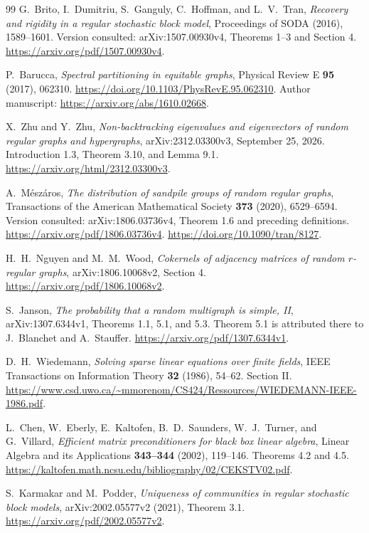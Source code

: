\begin{thebibliography}{99}
G.~Brito, I.~Dumitriu, S.~Ganguly, C.~Hoffman, and L.~V.~Tran,
\emph{Recovery and rigidity in a regular stochastic block model},
Proceedings of SODA (2016), 1589--1601.
Version consulted: arXiv:1507.00930v4, Theorems 1--3 and Section 4.
\url{https://arxiv.org/pdf/1507.00930v4}.

P.~Barucca, \emph{Spectral partitioning in equitable graphs},
Physical Review E \textbf{95} (2017), 062310.
\url{https://doi.org/10.1103/PhysRevE.95.062310}.
Author manuscript: \url{https://arxiv.org/abs/1610.02668}.

X.~Zhu and Y.~Zhu, \emph{Non-backtracking eigenvalues and eigenvectors
of random regular graphs and hypergraphs}, arXiv:2312.03300v3,
September 25, 2026. Introduction 1.3, Theorem 3.10, and Lemma 9.1.
\url{https://arxiv.org/html/2312.03300v3}.

A.~M\'esz\'aros, \emph{The distribution of sandpile groups of random
regular graphs}, Transactions of the American Mathematical Society
\textbf{373} (2020), 6529--6594.
Version consulted: arXiv:1806.03736v4, Theorem 1.6 and preceding definitions.
\url{https://arxiv.org/pdf/1806.03736v4}.
\url{https://doi.org/10.1090/tran/8127}.

H.~H.~Nguyen and M.~M.~Wood,
\emph{Cokernels of adjacency matrices of random $r$-regular graphs},
arXiv:1806.10068v2, Section 4.
\url{https://arxiv.org/pdf/1806.10068v2}.

S.~Janson, \emph{The probability that a random multigraph is simple, II},
arXiv:1307.6344v1, Theorems 1.1, 5.1, and 5.3.
Theorem 5.1 is attributed there to J.~Blanchet and A.~Stauffer.
\url{https://arxiv.org/pdf/1307.6344v1}.

D.~H.~Wiedemann, \emph{Solving sparse linear equations over finite fields},
IEEE Transactions on Information Theory \textbf{32} (1986), 54--62.
Section II.
\url{https://www.csd.uwo.ca/~mmorenom/CS424/Ressources/WIEDEMANN-IEEE-1986.pdf}.

L.~Chen, W.~Eberly, E.~Kaltofen, B.~D.~Saunders, W.~J.~Turner,
and G.~Villard, \emph{Efficient matrix preconditioners for black box
linear algebra}, Linear Algebra and its Applications \textbf{343--344}
(2002), 119--146. Theorems 4.2 and 4.5.
\url{https://kaltofen.math.ncsu.edu/bibliography/02/CEKSTV02.pdf}.

S.~Karmakar and M.~Podder, \emph{Uniqueness of communities in regular
stochastic block models}, arXiv:2002.05577v2 (2021), Theorem 3.1.
\url{https://arxiv.org/pdf/2002.05577v2}.


\end{thebibliography}
